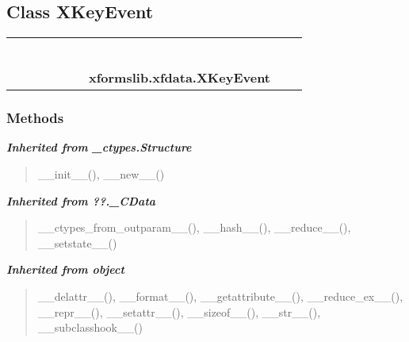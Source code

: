 \subsection{Class XKeyEvent}

    \label{xformslib:xfdata:XKeyEvent}
\begin{tabular}{cccccccccc}
\multicolumn{2}{r}{\settowidth{\BCL}{object}\multirow{2}{\BCL}{object}}
&&
&&
&&
  \\\cline{3-3}
  &&\multicolumn{1}{c|}{}
&&
&&
&&
  \\
\multicolumn{4}{r}{\settowidth{\BCL}{??.\_CData}\multirow{2}{\BCL}{??.\_CData}}
&&
&&
  \\\cline{5-5}
  &&&&\multicolumn{1}{c|}{}
&&
&&
  \\
\multicolumn{6}{r}{\settowidth{\BCL}{\_ctypes.Structure}\multirow{2}{\BCL}{\_ctypes.Structure}}
&&
  \\\cline{7-7}
  &&&&&&\multicolumn{1}{c|}{}
&&
  \\
&&&&&&\multicolumn{2}{l}{\textbf{xformslib.xfdata.XKeyEvent}}
\end{tabular}



  \subsubsection{Methods}


\large{\textbf{\textit{Inherited from \_ctypes.Structure}}}

\begin{quote}
\_\_init\_\_(), \_\_new\_\_()
\end{quote}

\large{\textbf{\textit{Inherited from ??.\_CData}}}

\begin{quote}
\_\_ctypes\_from\_outparam\_\_(), \_\_hash\_\_(), \_\_reduce\_\_(), \_\_setstate\_\_()
\end{quote}

\large{\textbf{\textit{Inherited from object}}}

\begin{quote}
\_\_delattr\_\_(), \_\_format\_\_(), \_\_getattribute\_\_(), \_\_reduce\_ex\_\_(), \_\_repr\_\_(), \_\_setattr\_\_(), \_\_sizeof\_\_(), \_\_str\_\_(), \_\_subclasshook\_\_()
\end{quote}

